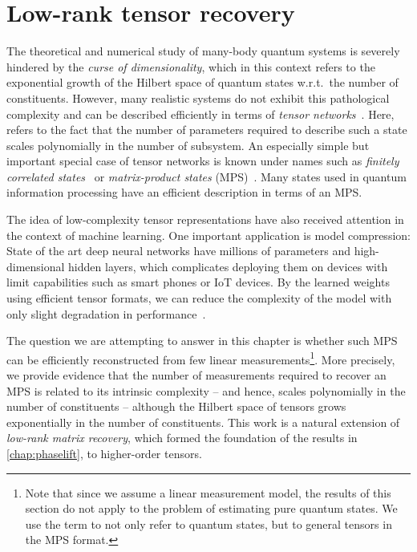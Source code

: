 
\chapter{Low-rank tensor recovery}%
\label{chap:tensors}


The theoretical and numerical study of many-body quantum systems is severely hindered by the \emph{curse of dimensionality}, which in this context refers to the exponential growth of the Hilbert space of quantum states w.r.t.\ the number of constituents.
However, many realistic systems do not exhibit this pathological complexity and can be described efficiently in terms of \emph{tensor networks}~\cite{Bridgeman_2017_HandWaving,Orus_2014_Practical}.
Here,  refers to the fact that the number of parameters required to describe such a state scales polynomially in the number of subsystem.
An especially simple but important special case of tensor networks is known under names such as \emph{finitely correlated states}~\cite{Fannes_1992_Finitely} or \emph{matrix-product states} (MPS)~\cite{Garcia_2006_Matrix,Verstraete_2008_Matrix}.
Many states used in quantum information processing have an efficient description in terms of an MPS.

The idea of low-complexity tensor representations have also received attention in the context of machine learning.
One important application is model compression:
State of the art deep neural networks have millions of parameters and high-dimensional hidden layers, which complicates deploying them on devices with limit capabilities such as smart phones or IoT devices.
By  the learned weights using efficient tensor formats, we can reduce the complexity of the model with only slight degradation in performance~\cite{Novikov_2015_Tensorizing,Tai_2015_Convolutional,Yang_2016_Deep}.

The question we are attempting to answer in this chapter is whether such MPS can be efficiently reconstructed from few linear measurements\footnote{%
  Note that since we assume a linear measurement model, the results of this section do not apply to the problem of estimating pure quantum states.
  We use the term  to not only refer to quantum states, but to general tensors in the MPS format.
}.
More precisely, we provide evidence that the number of measurements required to recover an MPS is related to its intrinsic complexity -- and hence, scales polynomially in the number of constituents -- although the Hilbert space of tensors grows exponentially in the number of constituents.
This work is a natural extension of \emph{low-rank matrix recovery}, which formed the foundation of the results in \cref{chap:phaselift}, to higher-order tensors.\\



